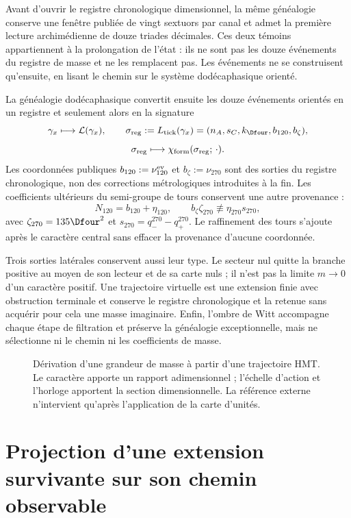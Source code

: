 Avant d'ouvrir le registre chronologique dimensionnel, la même généalogie conserve une
fenêtre publiée de vingt sextuors par canal et admet la première lecture
archimédienne de douze triades décimales. Ces deux témoins appartiennent à la
prolongation de l'état : ils ne sont pas les douze événements du registre de masse et ne les
remplacent pas. Les événements ne se construisent qu'ensuite, en lisant le chemin sur le
système dodécaphasique orienté.

La généalogie dodécaphasique convertit ensuite les douze événements orientés en un
registre et seulement alors en la signature
\[
 \gamma_x\longmapsto\mathcal L(\gamma_x),\qquad
 \sigma_{\rm reg}:=L_{\rm tick}(\gamma_x)
 =(n_A,s_C,k_{\Dfour},b_{120},b_{\zeta}),
\]
\[
 \sigma_{\rm reg}\longmapsto
 \chi_{\rm form}(\sigma_{\rm reg};\,\cdot).
\]
Les coordonnées publiques \(b_{120}:=\nu_{120}^{\rm ev}\) et
\(b_{\zeta}:=\nu_{270}\) sont des sorties du registre chronologique, non des corrections
métrologiques introduites à la fin. Les coefficients ultérieurs du
semi-groupe de tours conservent une autre provenance :
\[
 N_{120}=b_{120}+\eta_{120},\qquad
 b_{\zeta}\zeta_{270}\not\equiv\eta_{270}s_{270},
\]
avec \(\zeta_{270}=135\Dfour^2\) et
\(s_{270}=q_-^{270}-q_+^{270}\). Le raffinement des tours s'ajoute après
le caractère central sans effacer la provenance d'aucune coordonnée.

Trois sorties latérales conservent aussi leur type. Le secteur nul quitte la
branche positive au moyen de son lecteur et de sa carte nuls ; il n'est pas la limite
\(m\to0\) d'un caractère positif. Une trajectoire virtuelle est une extension
finie avec obstruction terminale et conserve le registre chronologique et la retenue sans acquérir pour
cela une masse imaginaire. Enfin, l'ombre de Witt accompagne chaque étape de filtration et
préserve la généalogie exceptionnelle, mais ne sélectionne ni le chemin ni les
coefficients de masse.

\begin{figure}[p]
\centering

\caption{Dérivation d'une grandeur de masse à partir d'une trajectoire HMT.
Le caractère apporte un rapport adimensionnel ; l'échelle d'action et l'horloge
apportent la section dimensionnelle. La référence externe n'intervient qu'après
l'application de la carte d'unités.}
\label{fig:derivacion-masa-rev9}
\end{figure}

\section{Projection d'une extension survivante sur son chemin observable}


